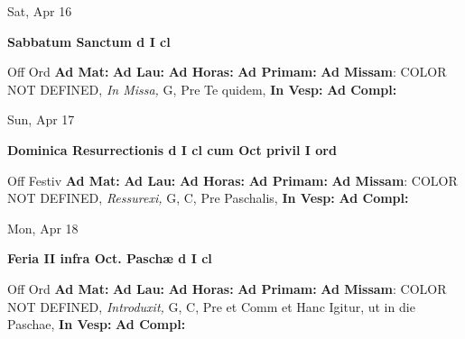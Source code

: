 \documentclass[10pt]{book}
\begin{document}
\begin{center}
\begin{minipage}{3.5in}
\vspace{2em}
\begin{center}Sat, Apr 16
\end{center}
\textbf{ \large Sabbatum Sanctum
\textnormal{\normalsize d I cl}}

\begin{justify}Off Ord
\textbf{Ad Mat: }
\textbf{Ad Lau: }
\textbf{Ad Horas: }
\textbf{Ad Primam: }\textbf{Ad Missam}: COLOR NOT DEFINED, \textit{In Missa,} G, Pre Te quidem, 
\textbf{In Vesp: }
\textbf{Ad Compl: }
\end{justify}
\end{minipage}
\end{center}

\begin{center}
\begin{minipage}{3.5in}
\vspace{2em}
\begin{center}Sun, Apr 17
\end{center}
\textbf{ \large Dominica Resurrectionis
\textnormal{\normalsize d I cl cum Oct privil I ord}}

\begin{justify}Off Festiv
\textbf{Ad Mat: }
\textbf{Ad Lau: }
\textbf{Ad Horas: }
\textbf{Ad Primam: }\textbf{Ad Missam}: COLOR NOT DEFINED, \textit{Ressurexi,} G, C, Pre Paschalis, 
\textbf{In Vesp: }
\textbf{Ad Compl: }
\end{justify}
\end{minipage}
\end{center}

\begin{center}
\begin{minipage}{3.5in}
\vspace{2em}
\begin{center}Mon, Apr 18
\end{center}
\textbf{ \large Feria II infra Oct. Paschæ
\textnormal{\normalsize d I cl}}

\begin{justify}Off Ord
\textbf{Ad Mat: }
\textbf{Ad Lau: }
\textbf{Ad Horas: }
\textbf{Ad Primam: }\textbf{Ad Missam}: COLOR NOT DEFINED, \textit{Introduxit,} G, C, Pre et Comm et Hanc Igitur, ut in die Paschae, 
\textbf{In Vesp: }
\textbf{Ad Compl: }
\end{justify}
\end{minipage}
\end{center}
\end{document}

